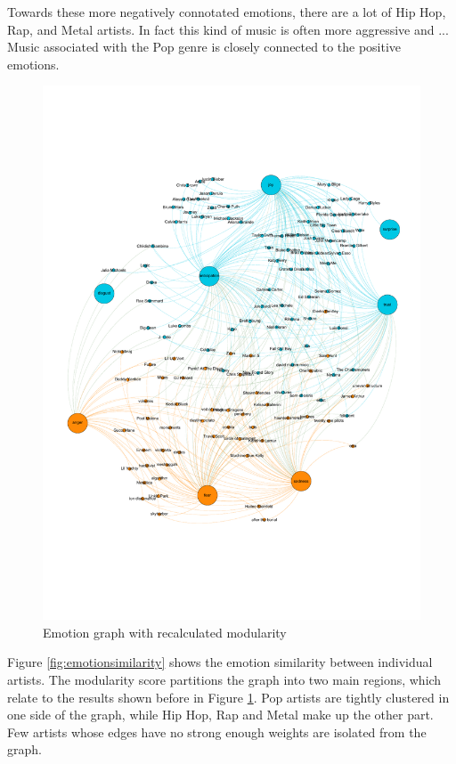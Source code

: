 \documentclass[10pt,a4paper]{article}
\begin{document}
		Towards these more negatively connotated emotions, there are a lot of Hip Hop, Rap, and Metal artists. In fact this kind of music is often more aggressive and ...
		Music associated with the Pop genre is closely connected to the positive emotions.
		
		\begin{figure}[htb]
			\centering
			\includegraphics[trim=0mm 50mm 0mm 45mm, clip, width=\linewidth]{data/emotion_graph_new_modularity}
			\caption{Emotion graph with recalculated modularity}
			\label{fig:emotionnewmod}
		\end{figure}
		
		Figure \ref{fig:emotionsimilarity} shows the emotion similarity between individual artists. The modularity score partitions the graph into two main regions, which relate to the results shown before in Figure \ref{fig:emotionnewmod}. Pop artists are tightly clustered in one side of the graph, while Hip Hop, Rap and Metal make up the other part. Few artists whose edges have no strong enough weights are isolated from the graph.
		
\end{document}
